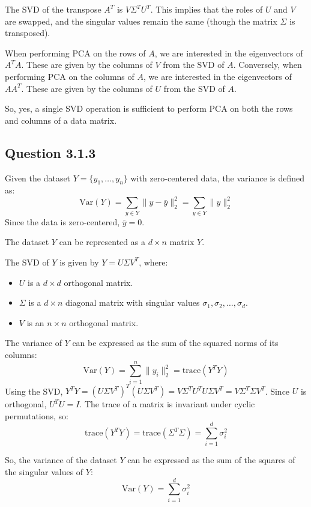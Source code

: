 \documentclass{article}
\begin{document}
The SVD of the transpose \( A^T \) is \( V \Sigma^T U^T \). This implies that the roles of \( U \) and \( V \) are swapped, and the singular values remain the same (though the matrix \( \Sigma \) is transposed).

When performing PCA on the rows of \( A \), we are interested in the eigenvectors of \( A^T A \). These are given by the columns of \( V \) from the SVD of \( A \). Conversely, when performing PCA on the columns of \( A \), we are interested in the eigenvectors of \( A A^T \). These are given by the columns of \( U \) from the SVD of \( A \).

So, yes, a single SVD operation is sufficient to perform PCA on both the rows and columns of a data matrix. 

\subsection{Question 3.1.3}


Given the dataset \( Y = \{y_1, \ldots, y_n\} \) with zero-centered data, the variance is defined as:
\[
\text{Var}(Y) = \sum_{y \in Y} \|y - \bar{y}\|^2_2 = \sum_{y \in Y} \|y\|^2_2
\]
Since the data is zero-centered, \(\bar{y} = 0\).

The dataset \( Y \) can be represented as a \( d \times n \) matrix \( Y \).

The SVD of \( Y \) is given by \( Y = U \Sigma V^T \), where:
\begin{itemize}
    \item \( U \) is a \( d \times d \) orthogonal matrix.
    \item \( \Sigma \) is a \( d \times n \) diagonal matrix with singular values \(\sigma_1, \sigma_2, \ldots, \sigma_d\).
    \item \( V \) is an \( n \times n \) orthogonal matrix.
\end{itemize}

The variance of \( Y \) can be expressed as the sum of the squared norms of its columns:
\[
\text{Var}(Y) = \sum_{i=1}^{n} \|y_i\|^2_2 = \text{trace}(Y^T Y)
\]
Using the SVD, \( Y^T Y = (U \Sigma V^T)^T (U \Sigma V^T) = V \Sigma^T U^T U \Sigma V^T = V \Sigma^T \Sigma V^T \).
Since \( U \) is orthogonal, \( U^T U = I \).
The trace of a matrix is invariant under cyclic permutations, so:
\[
\text{trace}(Y^T Y) = \text{trace}(\Sigma^T \Sigma) = \sum_{i=1}^{d} \sigma_i^2
\]

So, the variance of the dataset \( Y \) can be expressed as the sum of the squares of the singular values of \( Y \):
\[
\text{Var}(Y) = \sum_{i=1}^{d} \sigma_i^2
\]
\end{document}
